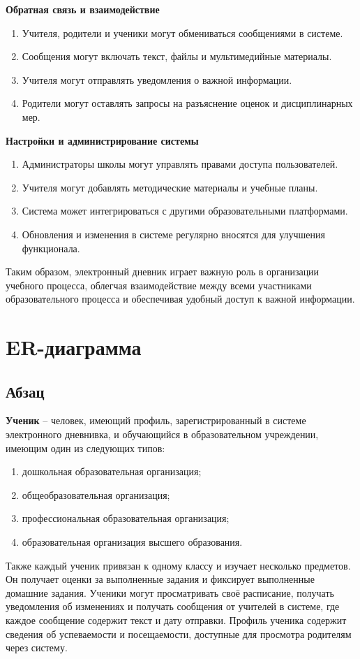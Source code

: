 \documentclass[a4paper, final]{article}
\begin{document}
\noindent \textbf{Обратная связь и взаимодействие}
\begin{enumerate}
  \item Учителя, родители и ученики могут обмениваться сообщениями в системе.
  \item Сообщения могут включать текст, файлы и мультимедийные материалы.
  \item Учителя могут отправлять уведомления о важной информации.
  \item Родители могут оставлять запросы на разъяснение оценок и дисциплинарных мер.
\end{enumerate}


\noindent \textbf{Настройки и администрирование системы}
\begin{enumerate}
  \item Администраторы школы могут управлять правами доступа пользователей.
  \item Учителя могут добавлять методические материалы и учебные планы.
  \item Система может интегрироваться с другими образовательными платформами.
  \item Обновления и изменения в системе регулярно вносятся для улучшения функционала.
\end{enumerate}
  
Таким образом, электронный дневник играет важную роль в организации учебного процесса, облегчая взаимодействие между всеми участниками образовательного процесса и обеспечивая удобный доступ к важной информации.

\newpage
\section{ER-диаграмма}
\subsection{Абзац}
\textbf{Ученик} -- человек, имеющий профиль, зарегистрированный в системе электронного дневнивка, и обучающийся в образовательном учреждении, имеющим один из следующих типов:
\begin{enumerate}
  \item дошкольная образовательная организация;
  \item общеобразовательная организация;
  \item профессиональная образовательная организация;
  \item образовательная организация высшего образования.
\end{enumerate}
Также каждый ученик привязан к одному классу и изучает несколько предметов. Он получает оценки за выполненные задания и фиксирует выполненные домашние задания. Ученики могут просматривать своё расписание, получать уведомления об изменениях и получать сообщения от учителей в системе, где каждое сообщение содержит текст и дату отправки. Профиль ученика содержит сведения об успеваемости и посещаемости, доступные для просмотра родителям через систему.
\end{document}
